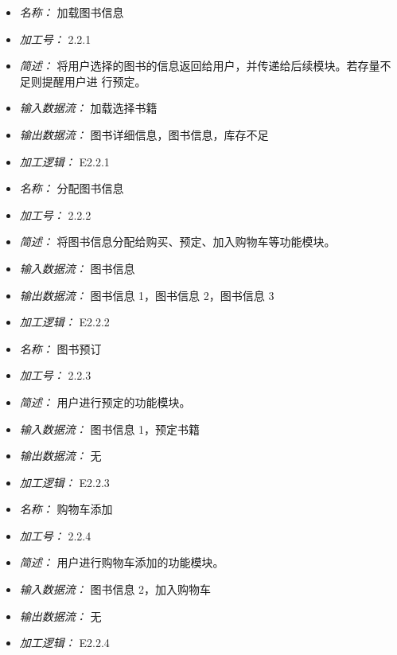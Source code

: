 \vspace{-1mm}


\begin{itemize}
\item \textit{名称： }加载图书信息
\item \textit{加工号： }2.2.1 
\item \textit{简述： }将用户选择的图书的信息返回给用户，并传递给后续模块。若存量不足则提醒用户进 行预定。
\item \textit{输入数据流： }加载选择书籍
\item \textit{输出数据流： }图书详细信息，图书信息，库存不足
\item \textit{加工逻辑： }E2.2.1

\end{itemize}


\vspace{-1mm}


\begin{itemize}
\item \textit{名称： }分配图书信息
\item \textit{加工号： }2.2.2 
\item \textit{简述： }将图书信息分配给购买、预定、加入购物车等功能模块。 
\item \textit{输入数据流： }图书信息
\item \textit{输出数据流： }图书信息 1，图书信息 2，图书信息 3 
\item \textit{加工逻辑： }E2.2.2

\end{itemize}


\vspace{-1mm}


\begin{itemize}
\item \textit{名称： }图书预订
\item \textit{加工号： }2.2.3 
\item \textit{简述： }用户进行预定的功能模块。 
\item \textit{输入数据流： }图书信息 1，预定书籍 
\item \textit{输出数据流： }无
\item \textit{加工逻辑： }E2.2.3

\end{itemize}


\vspace{-1mm}


\begin{itemize}
\item \textit{名称： }购物车添加
\item \textit{加工号： }2.2.4 
\item \textit{简述： }用户进行购物车添加的功能模块。 
\item \textit{输入数据流： }图书信息 2，加入购物车 
\item \textit{输出数据流： }无
\item \textit{加工逻辑： }E2.2.4

\end{itemize}


